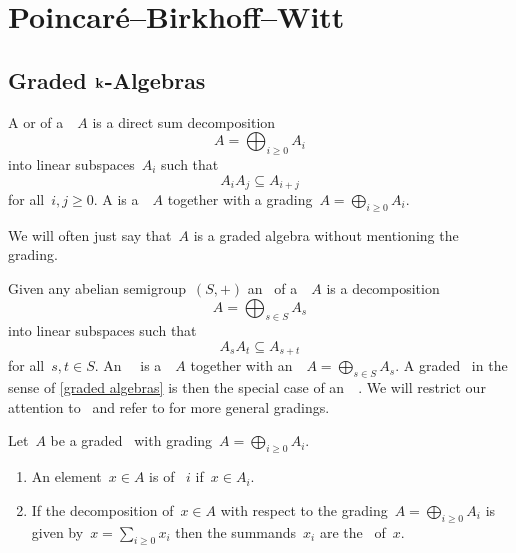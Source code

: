 \section{Poincar\'{e}--Birkhoff--Witt}





\subsection{Graded \texorpdfstring{$\kf$}{k}-Algebras}


\begin{definition}
  \label{graded algebras}
  A  or  of a~\algebra{$\kf$}~$A$ is a direct sum decomposition
  \[
    A
    =
    \bigoplus_{i \geq 0} A_i
  \]
  into linear subspaces~$A_i$ such that
  \[
    A_i A_j
    \subseteq
    A_{i+j}
  \]
  for all~$i, j \geq 0$.
  A  is a~\algebra{$\kf$}~$A$ together with a grading~$A = \bigoplus_{i \geq 0} A_i$.
\end{definition}


\begin{remark}
  We will often just say that~$A$ is a graded algebra without mentioning the grading.
\end{remark}


\begin{remark}
  Given any abelian semigroup~$(S, +)$ an~ of a~\algebra{$\kf$}~$A$ is a decomposition
  \[
    A
    =
    \bigoplus_{s \in S} A_s
  \]
  into linear subspaces such that
  \[
    A_s A_t
    \subseteq
    A_{s + t}
  \]
  for all~$s,t \in S$.
  An~{}~\algebra{$\kf$} is a~\algebra{$\kf$}~$A$ together with an~~$A = \bigoplus_{s \in S} A_s$.
  A graded~\algebra{$\kf$} in the sense of \cref{graded algebras} is then the special case of an~{\graded{$\Natural$}}~\algebra{$\kf$}.
  We will restrict our attention to~{\gradings{$\Natural$}} and refer to \cite[II.{\S}11, III.{\S}3]{bourbaki_algebra} for more general gradings.
\end{remark}


\begin{definition}
  Let~$A$ be a graded~{\algebra{$\kf$}} with grading~$A = \bigoplus_{i \geq 0} A_i$.
  \begin{enumerate}
    \item
      An element~$x \in A$ is  of ~$i$ if~$x \in A_i$.
    \item
      If the decomposition of~$x \in A$ with respect to the grading~$A = \bigoplus_{i \geq 0} A_i$ is given by~$x = \sum_{i \geq 0} x_i$ then the summands~$x_i$ are the~ of~$x$.
  \end{enumerate}
\end{definition}


